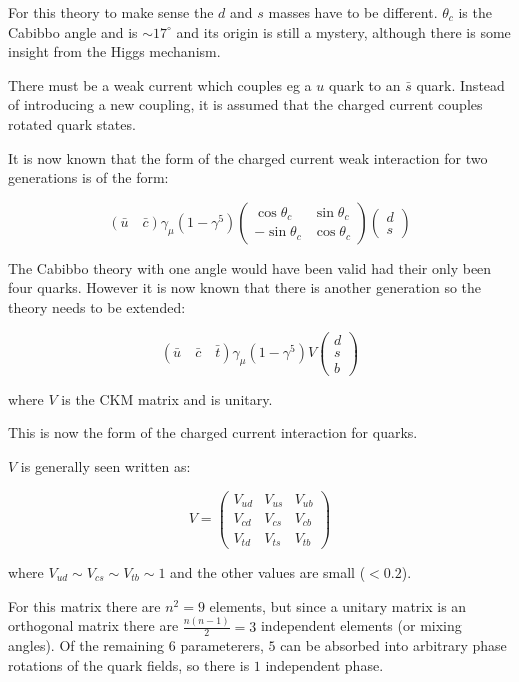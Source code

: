 For this theory to make sense the $d$ and $s$ masses have to be different.  $\theta_c$ is the Cabibbo angle and is $\sim 17^{\circ}$ and its origin is still a mystery, although there is some insight from the Higgs mechanism.

There must be a weak current which couples eg a $u$ quark to an $\bar{s}$ quark.  Instead of introducing a new coupling, it is assumed that the charged current couples rotated quark states.

It is now known that the form of the charged current weak interaction for two generations is of the form:

\[
  \left(\bar{u} \quad \bar{c}\right)\gamma_{\mu}\left(1 - \gamma^5\right)
  \left(
  \begin{array}{cc}
    \cos\theta_c  & \sin\theta_c \\
    -\sin\theta_c & \cos\theta_c
  \end{array}
  \right)
  \left(
  \begin{array}{c}
    d \\
    s
  \end{array}
  \right)
\]

The Cabibbo theory with one angle would have been valid had their only been four quarks.  However it is now known that there is another generation so the theory needs to be extended:

\[
  \left(\bar{u}\quad\bar{c}\quad\bar{t}\right)\gamma_{\mu}\left(1 - \gamma^5\right)V
  \left(
  \begin{array}{c}
    d \\
    s \\
    b
  \end{array}
  \right)
\]

where $V$ is the CKM matrix and is unitary.

This is now the form of the charged current interaction for quarks.

$V$ is generally seen written as:

\[
  V =
  \left(
  \begin{array}{ccc}
    V_{ud} & V_{us} & V_{ub} \\
    V_{cd} & V_{cs} & V_{cb} \\
    V_{td} & V_{ts} & V_{tb}
  \end{array}
  \right)
\]

where $V_{ud} \sim V_{cs} \sim V_{tb} \sim 1$ and the other values are small ($< 0.2$).

For this matrix there are $n^2 = 9$ elements, but since a unitary matrix is an orthogonal matrix there are $\frac{n(n-1)}{2}=3$ independent elements (or mixing angles).  Of the remaining $6$ parameterers, $5$ can be absorbed into arbitrary phase rotations of the quark fields, so there is $1$ independent phase.

